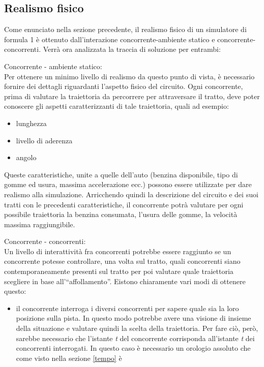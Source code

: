 \subsection{Realismo fisico}
\label{analisi_realismo_fisico}
Come enunciato nella sezione precedente, il realismo fisico di un simulatore di
formula 1 è ottenuto dall'interazione
concorrente-ambiente statico e concorrente-concorrenti. Verrà ora analizzata la
traccia di soluzione per entrambi:
\begin{description}
\item{Concorrente - ambiente statico:}\\
Per ottenere un minimo livello di realismo da questo punto di vista, è
necessario fornire dei dettagli riguardanti l'aspetto fisico
del circuito. Ogni concorrente, prima di valutare la traiettoria da percorrere
per attraversare il tratto, deve poter conoscere
gli aspetti caratterizzanti di tale traiettoria, quali ad esempio:
\begin{itemize}
\item lunghezza 
\item livello di aderenza
\item angolo
\end{itemize}
Queste caratteristiche, unite a quelle dell'auto (benzina disponibile, tipo di
gomme ed usura, massima accelerazione ecc.)
possono essere utilizzate per dare realismo alla simulazione.
Arricchendo quindi la descrizione del circuito e dei suoi tratti con le
precedenti caratteristiche, il concorrente potrà
valutare per ogni possibile traiettoria la benzina consumata, l'usura delle
gomme, la velocità massima raggiungibile.
\item{Concorrente - concorrenti:}\\
Un livello di interattività fra concorrenti potrebbe essere raggiunto se 
un concorrente potesse controllare, una volta sul tratto, quali concorrenti
siano contemporaneamente presenti sul tratto
per poi valutare quale traiettoria scegliere in base all'``affollamento''.
Eistono chiaramente vari modi di ottenere questo:
\begin{itemize}
\item il concorrente interroga i diversi concorrenti per sapere quale sia la
loro posizione sulla pista. In questo modo potrebbe
avere una visione di insieme della situazione e valutare quindi la scelta della
traiettoria. Per fare ciò, però, sarebbe 
necessario che l'istante \emph{t} del concorrente corrisponda all'istante
\emph{t} dei concorrenti interrogati. In questo caso
è necessario un orologio assoluto che come visto nella sezione \ref{tempo} è

\end{itemize}
\end{description}
